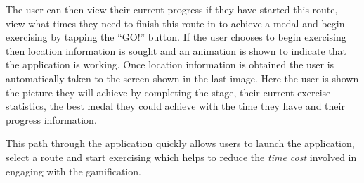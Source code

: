 The user can then view their current progress if they have started
this route, view what times they need to finish this route in to
achieve a medal and begin exercising by tapping the ``GO!''
button. If the user chooses to begin exercising then location
information is sought and an animation is shown to indicate that the
application is working. Once location information is obtained the user
is automatically taken to the screen shown in the last image. Here the
user is shown the picture they will achieve by completing the stage,
their current exercise statistics, the best medal they could achieve
with the time they have and their progress information. 

This path through the application quickly allows users to launch the
application, select a route and start exercising which helps to reduce
the \emph{time cost} involved in engaging with the gamification. 

